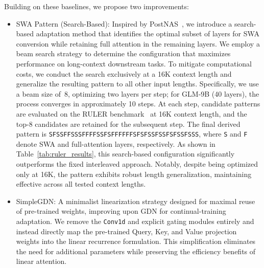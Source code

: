 \noindent Building on these baselines, we propose two improvements:

\begin{itemize}[leftmargin=1.5em,itemsep=2pt]
    \item {SWA Pattern (Search-Based):} Inspired by PostNAS~\cite{gu2025jet}, we introduce a search-based adaptation method that identifies the optimal subset of layers for SWA conversion while retaining full attention in the remaining layers. We employ a beam search strategy to determine the configuration that maximizes performance on long-context downstream tasks. To mitigate computational costs, we conduct the search exclusively at a 16K context length and generalize the resulting pattern to all other input lengths. Specifically, we use a beam size of~8, optimizing two layers per step; for GLM-9B (40 layers), the process converges in approximately 10 steps. At each step, candidate patterns are evaluated on the RULER benchmark~\cite{hsiehruler} at 16K context length, and the top-8 candidates are retained for the subsequent step. The final derived pattern is \texttt{SFSSFFSSSFFFFSSFSFFFFFFSFSFSSFSSFSFSSFSSS}, where \texttt{S} and \texttt{F} denote SWA and full-attention layers, respectively. As shown in Table~\ref{tab:ruler_results}, this search-based configuration significantly outperforms the fixed interleaved approach. Notably, despite being optimized only at 16K, the pattern exhibits robust length generalization, maintaining effective across all tested context lengths.

    \item {SimpleGDN:} A minimalist linearization strategy designed for maximal reuse of pre-trained weights, improving upon GDN for continual-training adaptation. We remove the \texttt{Conv1d} and explicit gating modules entirely and instead directly map the pre-trained Query, Key, and Value projection weights into the linear recurrence formulation. This simplification eliminates the need for additional parameters while preserving the efficiency benefits of linear attention.
\end{itemize}

